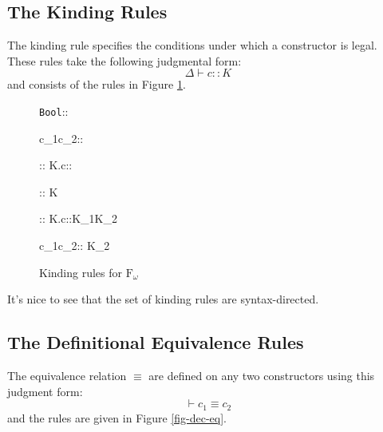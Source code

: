 \documentclass[]{article}
\newcommand{\kto}{\Rightarrow}
\newcommand{\lo}{\text{F}_\omega}
\newcommand{\teq}{\equiv}
\begin{document}
\subsection{The Kinding Rules}
The kinding rule specifies the conditions under which a constructor
is legal. These rules take the following judgmental form:
$$
\Delta\vdash c::K
$$
and consists of the rules in Figure \ref{fig-dec-kinding}.

\begin{figure}[!ht]
\infrule[K-TyBool]
  {}
  {\Delta\vdash \texttt{Bool}:: \star}

  {\Delta\vdash c_1\to c_2:: \star}
\begin{shaded}
  {\Delta\vdash \forall\alpha:: K.c::\star}
\end{shaded}
  {\Delta\vdash \alpha:: K}

  {\Delta\vdash \Lambda \alpha:: K.c::K_1\kto K_2}

\infrule[K-TyApp]
  {\Delta\vdash c_1::K_1\kto K_2\andalso \Delta\vdash c_2::K_1}
  {\Delta\vdash c_1\;c_2:: K_2}

  \caption{Kinding rules for $\lo$}
  \label{fig-dec-kinding}
\end{figure}
It's nice to see that the set of kinding rules are syntax-directed.

\subsection{The Definitional Equivalence Rules}
The equivalence relation $\teq$ are defined on any two constructors
using this judgment form:
$$
\vdash c_1\teq c_2
$$
and the rules are given in Figure \ref{fig-dec-eq}.
\end{document}
